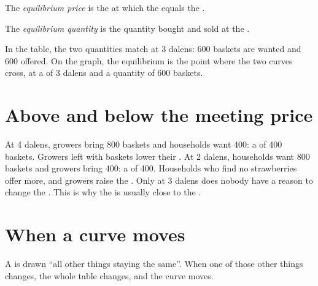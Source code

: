 \begin{definition}\label{def:g7:demand-and-supply-first-look:equilibrium-price}
The \emph{equilibrium price} is the  at which the  equals the .
\end{definition}

\begin{definition}\label{def:g7:demand-and-supply-first-look:equilibrium-quantity}
The \emph{equilibrium quantity} is the quantity bought and sold
at the .
\end{definition}

In the table, the two quantities match at 3 dalens: 600 baskets are wanted and 600 offered.
On the graph, the equilibrium is the point where the two curves cross, at a  of 3
dalens and a quantity of 600 baskets.

\section{Above and below the meeting price}

At 4 dalens, growers bring 800 baskets and households want 400: a  of 400
baskets. Growers left with baskets lower their . At 2 dalens, households want 800
baskets and growers bring 400: a  of 400. Households who find no strawberries offer
more, and growers raise the . Only at 3 dalens does nobody have a reason to change the
. This is why the  is usually close to the .

\section{When a curve moves}

A  is drawn ``all other things staying the same''. When one of those other
things changes, the whole table changes, and the curve moves.

